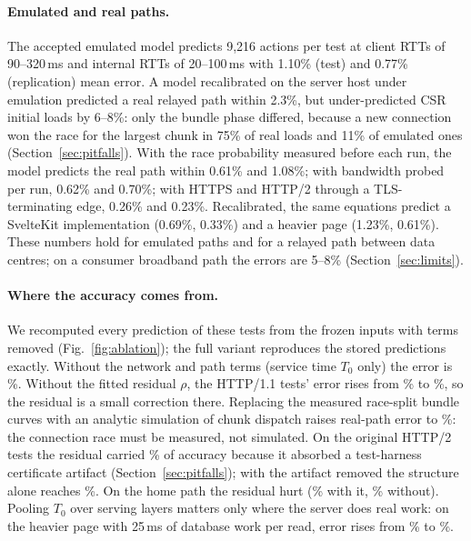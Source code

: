 \documentclass[acmsmall,review,nonacm]{acmart}
\begin{document}
\paragraph{Emulated and real paths.}
The accepted emulated model predicts 9{,}216 actions per test at client RTTs of 90--320\,ms and internal RTTs of 20--100\,ms with 1.10\% (test) and 0.77\% (replication) mean error. A model recalibrated on the server host under emulation predicted a real relayed path within 2.3\%, but under-predicted CSR initial loads by 6--8\%: only the bundle phase differed, because a new connection won the race for the largest chunk in 75\% of real loads and 11\% of emulated ones (Section~\ref{sec:pitfalls}). With the race probability measured before each run, the model predicts the real path within 0.61\% and 1.08\%; with bandwidth probed per run, 0.62\% and 0.70\%; with HTTPS and HTTP/2 through a TLS-terminating edge, 0.26\% and 0.23\%. Recalibrated, the same equations predict a SvelteKit implementation (0.69\%, 0.33\%) and a heavier page (1.23\%, 0.61\%). These numbers hold for emulated paths and for a relayed path between data centres; on a consumer broadband path the errors are 5--8\% (Section~\ref{sec:limits}).

\paragraph{Where the accuracy comes from.}
We recomputed every prediction of these tests from the frozen inputs with terms removed (Fig.~\ref{fig:ablation}); the full variant reproduces the stored predictions exactly. Without the network and path terms (service time $T_0$ only) the error is \AoneServiceAll\%. Without the fitted residual $\rho$, the HTTP/1.1 tests' error rises from \AoneFullHone\% to \AoneNoRhoHone\%, so the residual is a small correction there. Replacing the measured race-split bundle curves with an analytic simulation of chunk dispatch raises real-path error to \AoneAbunReal\%: the connection race must be measured, not simulated. On the original HTTP/2 tests the residual carried \AoneNoRhoVnine\% of accuracy because it absorbed a test-harness certificate artifact (Section~\ref{sec:pitfalls}); with the artifact removed the structure alone reaches \AoneNoRhoVnineb\%. On the home path the residual hurt (\AoneFullHome\% with it, \AoneNoRhoHome\% without). Pooling $T_0$ over serving layers matters only where the server does real work: on the heavier page with 25\,ms of database work per read, error rises from \AoneNoRhoQ\% to \AonePooledQ\%.
\end{document}
